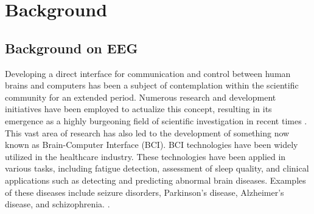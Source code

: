 \chapter{Background}
\label{ch:Foundation}
\section{Background on EEG}
\label{sec:Background:Background on EEG}
Developing a direct interface for communication and control between human brains and computers has been a subject of contemplation within the scientific community for an extended period. Numerous research and development initiatives have been employed to actualize this concept, resulting in its emergence as a highly burgeoning field of scientific investigation in recent times \cite{clinical_trails}. This vast area of research has also led to the development of something now known as Brain-Computer Interface (BCI). BCI technologies have been widely utilized in the healthcare industry. These technologies have been applied in various tasks, including fatigue detection, assessment of sleep quality, and clinical applications such as detecting and predicting abnormal brain diseases. Examples of these diseases include seizure disorders, Parkinson's disease, Alzheimer's disease, and schizophrenia. \cite{BCI_applications}.
\smallskip

